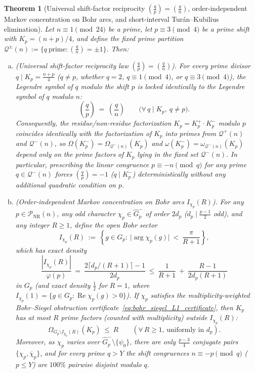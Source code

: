 \documentclass[11pt, a4paper]{article}
\theoremstyle{plain}
\newtheorem{theorem}{Theorem}[section]
\theoremstyle{definition}
\newcommand{\leg}[2]{\left(\frac{#1}{#2}\right)}
\begin{document}
\begin{theorem}[Universal shift-factor reciprocity $\leg{q}{p}=\leg{q}{n}$, order-independent Markov concentration on Bohr arcs, and short-interval Tur\'{a}n--Kubilius elimination]\label{thm:universal_factor_reciprocity_and_transversal_sieve}
Let $n\equiv1\pmod{24}$ be a prime, let $p\equiv3\pmod 4$ be a prime shift with $K_p=(n+p)/4$, and define the fixed prime partition $\mathcal{Q}^{\pm}(n):=\big\{q\ \text{prime}:\leg{q}{n}=\pm1\big\}$. Then:
\begin{enumerate}[(a)]
    \item \emph{(Universal shift-factor reciprocity law $\leg{q}{p}=\leg{q}{n}$).} For \emph{every} prime divisor $q\mid K_p=\frac{n+p}{4}$ ($q\neq p$, whether $q=2$, $q\equiv1\pmod 4$, or $q\equiv3\pmod 4$), the Legendre symbol of $q$ modulo the shift $p$ is locked identically to the Legendre symbol of $q$ modulo $n$:
    \begin{equation}\label{eq:universal_shift_factor_reciprocity}
    \leg{q}{p}\ =\ \leg{q}{n}\qquad\big(\forall\,q\mid K_p,\ q\neq p\big).
    \end{equation}
    Consequently, the residue/non-residue factorization $K_p=K_p^{+}\cdot K_p^{-}$ modulo $p$ coincides identically with the factorization of $K_p$ into primes from $\mathcal{Q}^{+}(n)$ and $\mathcal{Q}^{-}(n)$, so $\Omega(K_p^{-})=\Omega_{\mathcal{Q}^{-}(n)}(K_p)$ and $\omega(K_p^{-})=\omega_{\mathcal{Q}^{-}(n)}(K_p)$ depend only on the prime factors of $K_p$ lying in the fixed set $\mathcal{Q}^{-}(n)$. In particular, prescribing the linear congruence $p\equiv-n\pmod q$ for any prime $q\in\mathcal{Q}^{-}(n)$ forces $\leg{q}{p}=-1$ ($q\mid K_p^{-}$) \emph{deterministically} without any additional quadratic condition on $p$.

    \item \emph{(Order-independent Markov concentration on Bohr arcs $I_{\chi_p}(R)$).} For any $p\in\mathcal{P}_{\mathrm{NR}}(n)$, any odd character $\chi_p\in\widehat{G}_p^{-}$ of order $2d_p$ ($d_p\mid\frac{p-1}{2}$ odd), and any integer $R\ge1$, define the open Bohr sector
    \[
    I_{\chi_p}(R)\ :=\ \left\{g\in G_p:\ \big|\arg\chi_p(g)\big|\ <\ \frac{\pi}{R+1}\right\},
    \]
    which has exact density
    \[
    \frac{|I_{\chi_p}(R)|}{\varphi(p)}\ =\ \frac{2\lceil d_p/(R+1)\rceil-1}{2d_p}\ \le\ \frac{1}{R+1}\ +\ \frac{R-1}{2d_p(R+1)}
    \]
    in $G_p$ (and exact density $\frac12$ for $R=1$, where $I_{\chi_p}(1)=\{g\in G_p:\operatorname{Re}\chi_p(g)>0\}$). If $\chi_p$ satisfies the multiplicity-weighted Bohr--Siegel obstruction certificate~\eqref{eq:bohr_siegel_L1_certificate}, then $K_p$ has at most $R$ prime factors (counted with multiplicity) outside $I_{\chi_p}(R)$:
    \begin{equation}\label{eq:order_independent_markov_bohr}
    \Omega_{G_p\setminus I_{\chi_p}(R)}(K_p)\ \le\ R\qquad (\forall\,R\ge1,\ \text{uniformly in } d_p).
    \end{equation}
    Moreover, as $\chi_p$ varies over $\widehat{G}_p^{-}\setminus\{\psi_0\}$, there are only $\frac{p-3}{4}$ conjugate pairs $\{\chi_p,\overline{\chi}_p\}$, and for every prime $q>Y$ the shift congruences $n\equiv-p\pmod q$ ($p\le Y$) are $100\%$ pairwise disjoint modulo $q$.


\end{enumerate}
\end{theorem}
\end{document}
